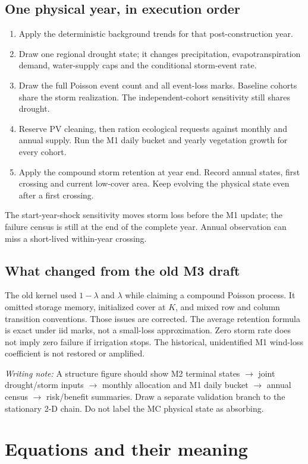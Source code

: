 \documentclass[11pt,a4paper]{article}
\newcommand{\note}[1]{\par\smallskip\textcolor{teal!70!black}{\textit{Writing note:} #1}\par}
\begin{document}
\subsection*{One physical year, in execution order}
\begin{enumerate}
\item Apply the deterministic background trends for that post-construction year.
\item Draw one regional drought state; it changes precipitation, evapotranspiration demand,
water-supply caps and the conditional storm-event rate.
\item Draw the full Poisson event count and all event-loss marks. Baseline cohorts share the storm
realization. The independent-cohort sensitivity still shares drought.
\item Reserve PV cleaning, then ration ecological requests against monthly and annual supply.
Run the M1 daily bucket and yearly vegetation growth for every cohort.
\item Apply the compound storm retention at year end. Record annual states, first crossing and
current low-cover area. Keep evolving the physical state even after a first crossing.
\end{enumerate}
The start-year-shock sensitivity moves storm loss before the M1 update; the failure census is
still at the end of the complete year. Annual observation can miss a short-lived within-year crossing.

\subsection*{What changed from the old M3 draft}
The old kernel used $1-\lambda$ and $\lambda$ while claiming a compound Poisson process.
It omitted storage memory, initialized cover at $K$, and mixed row and column transition conventions.
Those issues are corrected. The average retention formula is exact under iid marks, not a small-loss
approximation. Zero storm rate does not imply zero failure if irrigation stops. The historical,
unidentified M1 wind-loss coefficient is not restored or amplified.

\note{A structure figure should show M2 terminal states $\to$ joint drought/storm inputs $\to$
monthly allocation and M1 daily bucket $\to$ annual census $\to$ risk/benefit summaries.
Draw a separate validation branch to the stationary 2-D chain. Do not label the MC physical state as absorbing.}

\clearpage
\section{Equations and their meaning}
\end{document}

